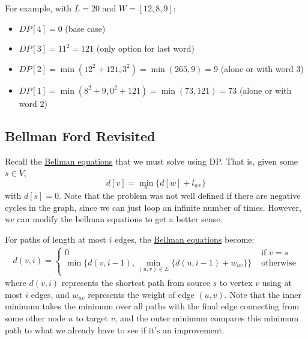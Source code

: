   \begin{example}
    \label{ex:dp-line-breaking}
    For example, with $L=20$ and $W=[12,8,9]$:
    \begin{itemize}
      \item $DP[4] = 0$ (base case)
      \item $DP[3] = 11^2 = 121$ (only option for last word)
      \item $DP[2] = \min(12^2 + 121, 3^2) = \min(265, 9) = 9$ (alone or with word 3)
      \item $DP[1] = \min(8^2 + 9, 0^2 + 121) = \min(73, 121) = 73$ (alone or with word 2)
    \end{itemize}
  \end{example}

\subsection{Bellman Ford Revisited} 

  Recall the \hyperref[thm:bellman-equations]{Bellman equations} that we must solve using DP. That is, given some $s \in V$, 
  \begin{equation}
    d[v] = \min_w \{ d[w] + l_{wv} \}
  \end{equation}
  with $d[s] = 0$. Note that the problem was not well defined if there are negative cycles in the graph, since we can just loop an infinite number of times. However, we can modify the bellman equations to get a better sense. 

  \begin{theorem}
    \label{thm:modified-bellman-equations}
    For paths of length at most $i$ edges, the \hyperref[thm:bellman-equations]{Bellman equations} become:
    \begin{align}
      d(v,i) = \begin{cases} 
        0 & \text{ if } v = s \\
        \min\{d(v,i-1), \min_{(u, v) \in E} \{d(u,i-1) + w_{uv}\}\} & \text{ otherwise}
      \end{cases}
    \end{align}
    where $d(v,i)$ represents the shortest path from source $s$ to vertex $v$ using at most $i$ edges, and $w_{uv}$ represents the weight of edge $(u, v)$. Note that the inner minimum takes the minimum over all paths with the final edge connecting from some other node $u$ to target $v$, and the outer minimum compares this minimum path to what we already have to see if it's an improvement. 
  \end{theorem} 

